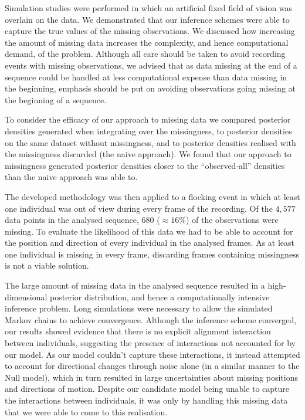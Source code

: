 Simulation studies were performed in which an artificial fixed field of vision
was overlain on the data. We demonstrated that our inference schemes were able
to capture the true values of the missing observations. We discussed how
increasing the amount of missing data increases the complexity, and hence
computational demand, of the problem. Although all care should be taken to
avoid recording events with missing observations, we advised that as data
missing at the end of a sequence could be handled at less computational expense
than data missing in the beginning, emphasis should be put on avoiding
observations going missing at the beginning of a sequence.

To consider the efficacy of our approach to missing data we compared posterior
densities generated when integrating over the missingness, to posterior
densities on the same dataset without missingness, and to posterior densities
realised with the missingness discarded (the naive approach). We found
that our approach to missingness generated posterior densities closer to the
``observed-all'' densities than the naive approach was able to. 

The developed methodology was then applied to a flocking event in which at
least one individual was out of view during every frame of the recording. Of
the $4,577$ data points in the analysed sequence, $680$ ($\approx16\%$) of the
observations were missing. To evaluate the likelihood of this data we had to be
able to account for the position and direction of every individual in the
analysed frames. As at least one individual is missing in every frame,
discarding frames containing missingness is not a viable solution.

The large amount of missing data in the analysed sequence resulted in a
high-dimensional posterior distribution, and hence a computationally intensive
inference problem. Long simulations were necessary to allow the simulated
Markov chains to achieve convergence. Although the inference scheme converged,
our results showed evidence that there is no explicit alignment interaction
between individuals, suggesting the presence of interactions not accounted for
by our model. As our model couldn't capture these interactions, it instead
attempted to account for directional changes through noise alone (in a similar
manner to the Null model), which in turn resulted in large uncertainties about
missing positions and directions of motion. Despite our candidate model being
unable to capture the interactions between individuals, it was only by handling
this missing data that we were able to come to this realisation.
